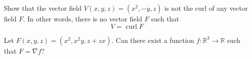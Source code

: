 \documentclass[openany]{book}
\newcommand{\R}{\mathbb{R}}
\newcommand{\curl}{\operatorname{curl}}
\begin{document}

\begin{prob}
    Show that the vector field $V(x,y,z)=(x^2, -y, z)$ is not the curl of any vector field $F$. In other words, there is no vector field $F$ such that 
    \begin{equation*}
        V=\curl F
    \end{equation*}
\end{prob}




\begin{prob}
    Let $F(x,y,z)=(x^2, x^2y, z+zx)$. Can there exist a function $f:\R^3\to\R$ such that $F=\nabla f$?
\end{prob}
\end{document}
